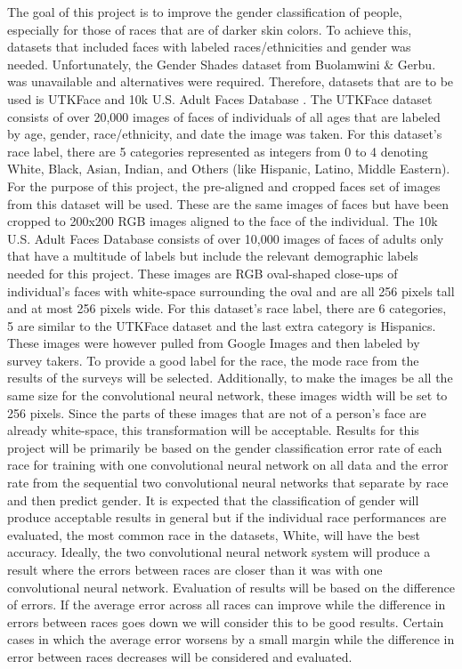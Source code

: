 \documentclass[10pt,twocolumn,letterpaper]{article}
\begin{document}
The goal of this project is to improve the gender classification of people, especially for those of races that are of darker skin colors. To achieve this, datasets that included faces with labeled races/ethnicities and gender was needed. Unfortunately, the Gender Shades dataset from Buolamwini \& Gerbu. \cite{Authors14} was unavailable and alternatives were required. Therefore, datasets that are to be used is UTKFace \cite{Authors14d} and 10k U.S. Adult Faces Database \cite{Authors14c}. The UTKFace dataset consists of over 20,000 images of faces of individuals of all ages that are labeled by age, gender, race/ethnicity, and date the image was taken. For this dataset’s race label, there are 5 categories represented as integers from 0 to 4 denoting White, Black, Asian, Indian, and Others (like Hispanic, Latino, Middle Eastern). For the purpose of this project, the pre-aligned and cropped faces set of images from this dataset will be used. These are the same images of faces but have been cropped to 200x200 RGB images aligned to the face of the individual. The 10k U.S. Adult Faces Database consists of over 10,000 images of faces of adults only that have a multitude of labels but include the relevant demographic labels needed for this project. These images are RGB oval-shaped close-ups of individual’s faces with white-space surrounding the oval and are all 256 pixels tall and at most 256 pixels wide. For this dataset’s race label, there are 6 categories, 5 are similar to the UTKFace dataset and the last extra category is Hispanics. These images were however pulled from Google Images and then labeled by survey takers. To provide a good label for the race, the mode race from the results of the surveys will be selected. Additionally, to make the images be all the same size for the convolutional neural network, these images width will be set to 256 pixels. Since the parts of these images that are not of a person’s face are already white-space, this transformation will be acceptable.
Results for this project will be primarily be based on the gender classification error rate of each race for training with one convolutional neural network on all data and the error rate from the sequential two convolutional neural networks that separate by race and then predict gender. It is expected that the classification of gender will produce acceptable results in general but if the individual race performances are evaluated, the most common race in the datasets, White, will have the best accuracy. Ideally, the two convolutional neural network system will produce a result where the errors between races are closer than it was with one convolutional neural network. Evaluation of results will be based on the difference of errors. If the average error across all races can improve while the difference in errors between races goes down we will consider this to be good results. Certain cases in which the average error worsens by a small margin while the difference in error between races decreases will be considered and evaluated.
\end{document}

